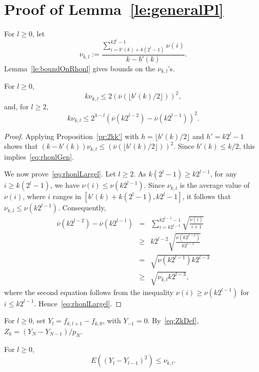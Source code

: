 \documentclass[a4paper,11pt]{article}
\begin{document}
\section{Proof of Lemma~\ref{le:generalPl}}
For \(l\geq0\), let  \begin{displaymath}
\nu_{k,l}:=\frac{\sum ^{k2^{l}-1}_{i=b'(k)+k(2^{l}-1)}\nu(i)}{k-b'(k)}.
\end{displaymath}
Lemma~\ref{le:boundOnRhonl} gives bounds on the \(\nu_{k,l}\)'s. 
\begin{lemma}\label{le:boundOnRhonl}
For \(l\geq0\),  \begin{equation}\label{eq:rhonlGen}
k\nu_{k,l}\leq 2(\overline{\nu}(\lfloor{b'(k)}/{2}\rfloor))^{2},
\end{equation}
and, for \(l\geq2\),
\begin{equation}\label{eq:rhonlLargel}
k\nu_{k,l}\le2^{3-l}(\overline{\nu}(k2^{l-2})-\overline{\nu}(k2^{l-1}))^{2}.
\end{equation}
\end{lemma}
\begin{proof}
Applying Proposition~\ref{pr:2kk'} with \(h=\lfloor b'(k)/2\rfloor\) and \(h'=k2^{l}-1\) shows that \((k-b'(k))\nu_{k,l}\leq(\overline{\nu}(\lfloor b'(k)/2\rfloor))^{2}\). Since  \(b'(k)\leq k/2\), this implies~\eqref{eq:rhonlGen}. 

We now prove~\eqref{eq:rhonlLargel}. Let \(l\ge2\). As \(k(2^{l}-1)\geq k2^{l-1}\), for any \(i\geq k(2^{l}-1)\), we have  \(\nu(i)\leq\nu(k2^{l-1}) \). Since \(\nu_{k,l}\) is the average value of   \(\nu(i)\), where \(i\) ranges in \([b'(k)+k(2^{l}-1), k2^{l}-1]\),  it follows that \(\nu_{k,l}\leq\nu(k2^{l-1}) \). Consequently,\begin{eqnarray*}\overline{\nu}(k2^{l-2})-\overline{\nu}(k2^{l-1})&=&\sum^{k2^{l-1}-1}_{i=k2^{l-2}}\sqrt{\frac{\nu(i)}{i+1}}\\
&\ge&k2^{l-2}\sqrt{\frac{\nu(k2^{l-1})}{k2^{l-1}}}\\
&=&\sqrt{\nu(k2^{l-1})k2^{l-3}}\\
&\ge&\sqrt{\nu_{k,l}k2^{l-3}},
\end{eqnarray*}
where the second equation follows from the inequality \(\nu(i)\geq\nu(k2^{l-1})\) for \(i\leq k2^{l-1}\). Hence~\eqref{eq:rhonlLargel}.
\end{proof}
For \(l\geq0\), set \(Y_{l}=f_{k,l+1}-f_{k,0}\), with \(Y_{-1}=0\). By~\eqref{eq:ZkDef}, \(Z_{k}=(Y_{N}-Y_{N-1})/p_{N}\). \begin{lemma}\label{le:upperBoundDiffY}
For \(l\geq0\), \begin{equation*}
E((Y_{l}-Y_{l-1})^{2})\leq\nu_{k,l}.
\end{equation*}
\end{lemma}
\end{document}
